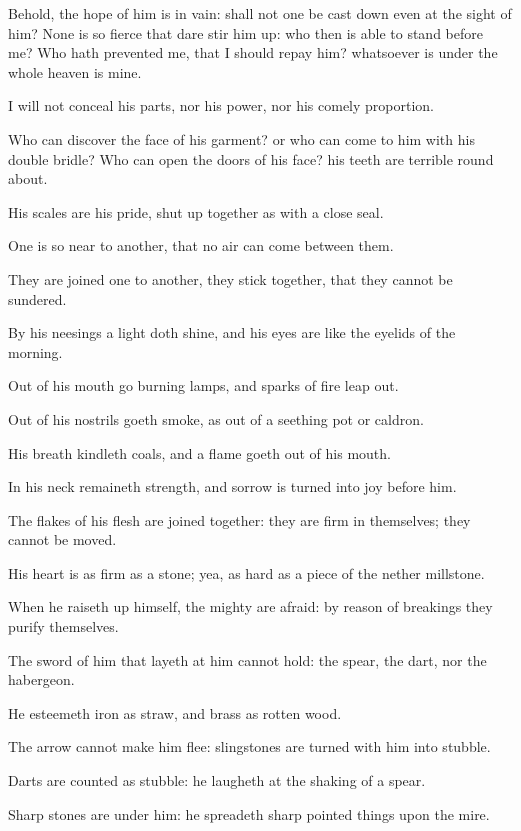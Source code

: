 \verse Behold, the hope of him is in vain: shall not one be cast down even at the sight of him?  \verse None is so fierce that dare stir him up: who then is able to stand before me?  \verse Who hath prevented me, that I should repay him? whatsoever is under the whole heaven is mine.

\verse I will not conceal his parts, nor his power, nor his comely proportion.

\verse Who can discover the face of his garment? or who can come to him with his double bridle?  \verse Who can open the doors of his face? his teeth are terrible round about.

\verse His scales are his pride, shut up together as with a close seal.

\verse One is so near to another, that no air can come between them.

\verse They are joined one to another, they stick together, that they cannot be sundered.

\verse By his neesings a light doth shine, and his eyes are like the eyelids of the morning.

\verse Out of his mouth go burning lamps, and sparks of fire leap out.

\verse Out of his nostrils goeth smoke, as out of a seething pot or caldron.

\verse His breath kindleth coals, and a flame goeth out of his mouth.

\verse In his neck remaineth strength, and sorrow is turned into joy before him.

\verse The flakes of his flesh are joined together: they are firm in themselves; they cannot be moved.

\verse His heart is as firm as a stone; yea, as hard as a piece of the nether millstone.

\verse When he raiseth up himself, the mighty are afraid: by reason of breakings they purify themselves.

\verse The sword of him that layeth at him cannot hold: the spear, the dart, nor the habergeon.

\verse He esteemeth iron as straw, and brass as rotten wood.

\verse The arrow cannot make him flee: slingstones are turned with him into stubble.

\verse Darts are counted as stubble: he laugheth at the shaking of a spear.

\verse Sharp stones are under him: he spreadeth sharp pointed things upon the mire.

